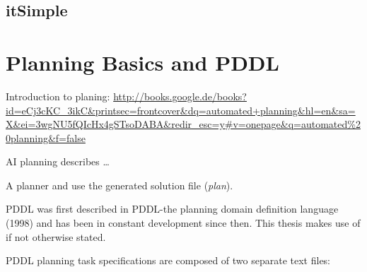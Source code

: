 \documentclass[11pt]{article}
\begin{document}
\subsection{itSimple}
\label{sec-2-4}
\section{Planning Basics and PDDL}
\label{sec-3}
\begin{center}
\end{center}


Introduction to planing:
\url{http://books.google.de/books?id=eCj3cKC_3ikC&printsec=frontcover&dq=automated+planning&hl=en&sa=X&ei=3wgNU5fQIcHx4gSTsoDABA&redir_esc=y#v=onepage&q=automated%20planning&f=false}

AI planning describes \ldots{}

A planner and use the generated solution file (\emph{plan}).

PDDL was first described in PDDL-the planning domain definition
language (1998) and has been in constant development since then.
This thesis makes use of \textcite{pddl3.1} if not otherwise stated. 

PDDL planning task specifications are composed of two separate text files:
\end{document}
